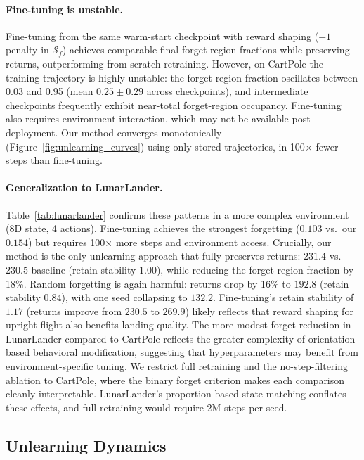 \documentclass[sigconf]{acmart}
\begin{document}
\paragraph{Fine-tuning is unstable.} Fine-tuning from the same warm-start checkpoint with reward shaping ($-1$ penalty in $\mathcal{S}_f$) achieves comparable final forget-region fractions while preserving returns, outperforming from-scratch retraining. However, on CartPole the training trajectory is highly unstable: the forget-region fraction oscillates between 0.03 and 0.95 (mean $0.25 \pm 0.29$ across checkpoints), and intermediate checkpoints frequently exhibit near-total forget-region occupancy. Fine-tuning also requires environment interaction, which may not be available post-deployment. Our method converges monotonically (Figure~\ref{fig:unlearning_curves}) using only stored trajectories, in 100$\times$ fewer steps than fine-tuning.

\paragraph{Generalization to LunarLander.} Table~\ref{tab:lunarlander} confirms these patterns in a more complex environment (8D state, 4 actions). Fine-tuning achieves the strongest forgetting ($0.103$ vs.\ our $0.154$) but requires 100$\times$ more steps and environment access. Crucially, our method is the only unlearning approach that fully preserves returns: $231.4$ vs.\ $230.5$ baseline (retain stability $1.00$), while reducing the forget-region fraction by 18\%. Random forgetting is again harmful: returns drop by 16\% to $192.8$ (retain stability $0.84$), with one seed collapsing to $132.2$. Fine-tuning's retain stability of $1.17$ (returns improve from $230.5$ to $269.9$) likely reflects that reward shaping for upright flight also benefits landing quality. The more modest forget reduction in LunarLander compared to CartPole reflects the greater complexity of orientation-based behavioral modification, suggesting that hyperparameters may benefit from environment-specific tuning. We restrict full retraining and the no-step-filtering ablation to CartPole, where the binary forget criterion makes each comparison cleanly interpretable. LunarLander's proportion-based state matching conflates these effects, and full retraining would require 2M steps per seed.

\subsection{Unlearning Dynamics}
\end{document}
